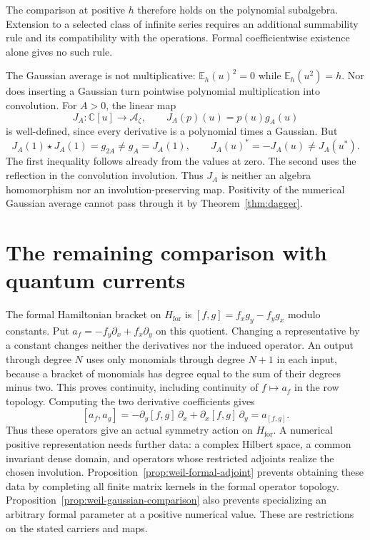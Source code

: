 \documentclass[11pt]{article}
\theoremstyle{definition}
\theoremstyle{remark}
\numberwithin{equation}{section}
\newcommand{\C}{\mathbb C}
\newcommand{\A}{\mathcal A}
\begin{document}
The comparison at positive $h$ therefore holds on the polynomial
subalgebra.  Extension to a selected class of infinite series requires
an additional summability rule and its compatibility with the operations.
Formal coefficientwise existence alone gives no such rule.

The Gaussian average is not multiplicative:
$\mathbb E_h(u)^2=0$ while $\mathbb E_h(u^2)=h$.
Nor does inserting a Gaussian turn pointwise polynomial multiplication
into convolution.  For $A>0$, the linear map
\[
 J_A:\C[u]\longrightarrow\A_\zeta,\qquad J_A(p)(u)=p(u)g_A(u)
\]
is well-defined, since every derivative is a polynomial times a Gaussian.
But
\[
 J_A(1)\star J_A(1)=g_{2A}\ne g_A=J_A(1),
 \qquad J_A(u)^*=-J_A(u)\ne J_A(u^*).
\]
The first inequality follows already from the values at zero.
The second uses the reflection in the convolution involution.
Thus $J_A$ is neither an algebra homomorphism nor an involution-preserving
map.  Positivity of the numerical Gaussian average cannot pass through
it by Theorem~\ref{thm:dagger}.

\section{The remaining comparison with quantum currents}
\label{sec:weil-current-comparison}

The formal Hamiltonian bracket on $H_{\mathrm{for}}$ is
$[f,g]=f_xg_y-f_yg_x$ modulo constants.
Put $a_f=-f_y\partial_x+f_x\partial_y$ on this quotient.
Changing a representative by a constant changes neither the derivatives
nor the induced operator.  An output through degree $N$ uses only
monomials through degree $N+1$ in each input, because a bracket of
monomials has degree equal to the sum of their degrees minus two.
This proves continuity, including continuity of $f\mapsto a_f$ in the
row topology.  Computing the two derivative coefficients gives
\[
 [a_f,a_g]=-\partial_y[f,g]\,\partial_x
                 +\partial_x[f,g]\,\partial_y=a_{[f,g]}.
\]
Thus these operators give an actual symmetry action on $H_{\mathrm{for}}$.
A numerical positive representation needs further data: a complex
Hilbert space, a common invariant dense domain, and
operators whose restricted adjoints realize the chosen involution.
Proposition~\ref{prop:weil-formal-adjoint} prevents obtaining these data
by completing all finite matrix kernels in the formal operator topology.
Proposition~\ref{prop:weil-gaussian-comparison} also prevents specializing
an arbitrary formal parameter at a positive numerical value.
These are restrictions on the stated carriers and maps.
\end{document}
